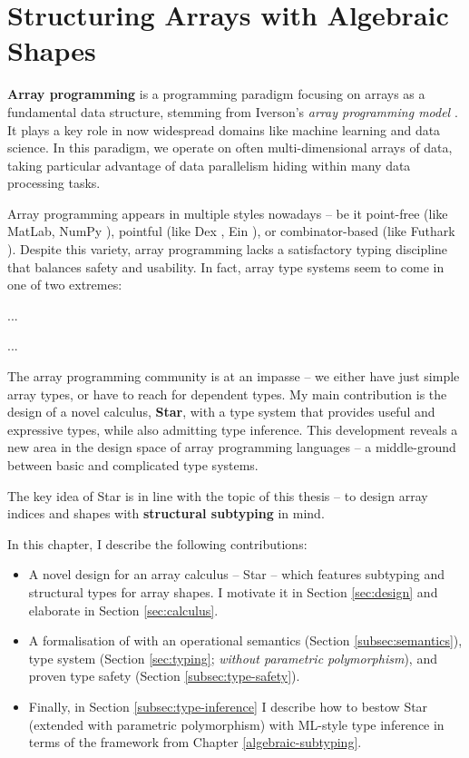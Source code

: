 \chapter{Structuring Arrays with Algebraic Shapes}
\label{star}

\textbf{Array programming} is a programming paradigm focusing on arrays as a fundamental data structure, stemming from Iverson's \emph{array programming model} \cite{apl}. It plays a key role in now widespread domains like machine learning and data science. In this paradigm, we operate on often multi-dimensional arrays of data, taking particular advantage of data parallelism hiding within many data processing tasks. 

Array programming appears in multiple styles nowadays -- be it point-free (like MatLab, NumPy \cite{numpy}), pointful (like Dex \cite{dex}, Ein \cite{ein}), or combinator-based (like Futhark \cite{futhark}). Despite this variety, array programming lacks a satisfactory typing discipline that balances safety and usability. In fact, array type systems seem to come in one of two extremes: \begin{description}
\color{red}
    \item[Nearly-untyped] ...
    \item[Dependently typed] ...
\end{description}

The array programming community is at an impasse -- we either have just simple array types, or have to reach for dependent types. My main contribution is the design of a novel calculus, \textbf{Star}, with a type system that provides useful and expressive types, while also admitting type inference. This development reveals a new area in the design space of array programming languages -- a middle-ground between basic and complicated type systems. 

The key idea of Star is in line with the topic of this thesis -- to design array indices and shapes with \textbf{structural subtyping} in mind.

In this chapter, I describe the following contributions: \begin{itemize}
    \item A novel design for an array calculus – Star – which features subtyping and structural types for array shapes. I motivate it in Section \ref{sec:design} and elaborate in Section \ref{sec:calculus}.
    \item A formalisation of with an operational semantics (Section \ref{subsec:semantics}), type system (Section \ref{sec:typing};  \emph{without parametric polymorphism}), and proven type safety (Section \ref{subsec:type-safety}).
    \item Finally, in Section \ref{subsec:type-inference} I describe how to bestow Star (extended with parametric polymorphism) with ML-style type inference in terms of the \inference{} framework from Chapter \ref{algebraic-subtyping}.
\end{itemize}

